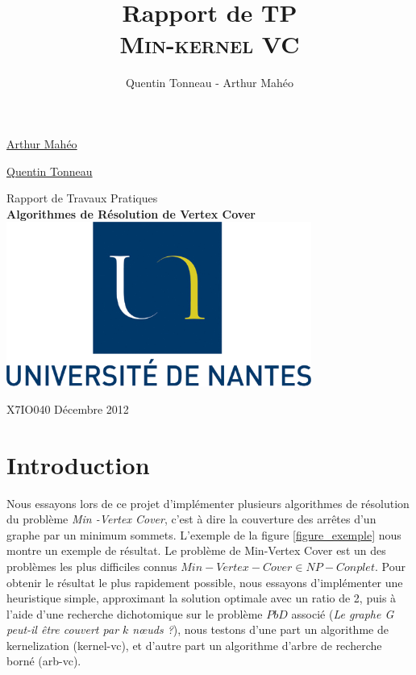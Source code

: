 \documentclass[a4paper,10pt,twoside]{report}
\title {Rapport de TP \\ \textsc{Min-kernel VC}}
\author {Quentin Tonneau - Arthur Mahéo}
\date{}
\begin{document}
\thispagestyle{empty}
\Large{\uline{
\noindent Arthur Mahéo}


\uline{Quentin Tonneau}}
\vfill
\begin{center}
\Huge{
 Rapport de Travaux Pratiques\\
 \textbf{Algorithmes de Résolution de Vertex Cover}}
 \vfill
 \includegraphics[width=0.75\textwidth]{logo_univ_nantes.png}
 \vfill
\end{center}
X7IO040 \hfill Décembre 2012
\tableofcontents
\newpage
\pagestyle{plain}
\chapter{Introduction}
  Nous essayons lors de ce projet d'implémenter plusieurs algorithmes de résolution du problème \textit{Min -Vertex Cover}, c'est à dire la couverture des arrêtes d'un graphe par un minimum sommets.
  L'exemple de la figure \ref{figure_exemple} nous montre un exemple de résultat. Le problème de Min-Vertex Cover est un des problèmes les plus difficiles connus $Min-Vertex-Cover \in NP-Conplet$.
  Pour obtenir le résultat le plus rapidement possible, nous essayons d'implémenter une heuristique simple, approximant la solution optimale avec un ratio de 2, puis à l'aide d'une recherche dichotomique sur le problème $PbD$ associé (\textit{Le graphe G peut-il être couvert par $k$ n\oe{}uds ?}), nous testons 
  d'une part un algorithme de kernelization (kernel-vc), et d'autre part un algorithme d'arbre de recherche borné (arb-vc).
\end{document}
